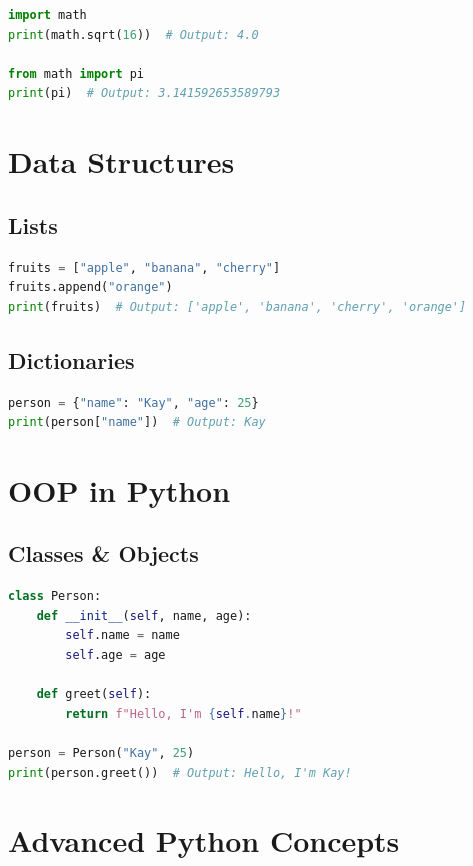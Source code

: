 \documentclass{article}
\begin{document}
\begin{lstlisting}[language=Python]
import math
print(math.sqrt(16))  # Output: 4.0

from math import pi
print(pi)  # Output: 3.141592653589793
\end{lstlisting}

\section{Data Structures}

\subsection{Lists}

\begin{lstlisting}[language=Python]
fruits = ["apple", "banana", "cherry"]
fruits.append("orange")
print(fruits)  # Output: ['apple', 'banana', 'cherry', 'orange']
\end{lstlisting}

\subsection{Dictionaries}

\begin{lstlisting}[language=Python]
person = {"name": "Kay", "age": 25}
print(person["name"])  # Output: Kay
\end{lstlisting}

\section{OOP in Python}

\subsection{Classes \& Objects}

\begin{lstlisting}[language=Python]
class Person:
    def __init__(self, name, age):
        self.name = name
        self.age = age

    def greet(self):
        return f"Hello, I'm {self.name}!"

person = Person("Kay", 25)
print(person.greet())  # Output: Hello, I'm Kay!
\end{lstlisting}

\section{Advanced Python Concepts}
\end{document}
